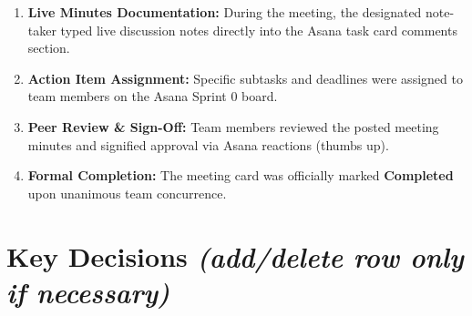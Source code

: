 \documentclass[11pt,letterpaper]{article}
\begin{document}
\vspace{0.4em}
\begin{enumerate}[itemsep=1pt, topsep=2pt, leftmargin=1.8em]
    \small
    \item \textbf{Live Minutes Documentation:} During the meeting, the designated note-taker typed live discussion notes directly into the Asana task card comments section.
    \item \textbf{Action Item Assignment:} Specific subtasks and deadlines were assigned to team members on the Asana Sprint 0 board.
    \item \textbf{Peer Review \& Sign-Off:} Team members reviewed the posted meeting minutes and signified approval via Asana reactions (thumbs up).
    \item \textbf{Formal Completion:} The meeting card was officially marked \textbf{\color{statusgreen}Completed} upon unanimous team concurrence.
\end{enumerate}

\newpage


\section{Key Decisions \textnormal{\small\textit{(add/delete row only if necessary)}}}
\end{document}

